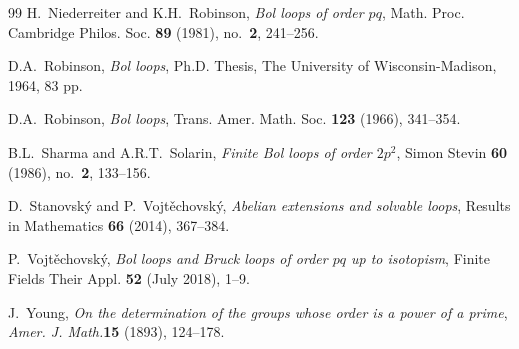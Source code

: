 \documentclass[12pt,reqno]{amsart}
\numberwithin{equation}{section}
\theoremstyle{plain}
\theoremstyle{definition}
\begin{document}
\begin{thebibliography}{99}
H.~Niederreiter and K.H.~Robinson, \emph{Bol loops of order $pq$}, Math. Proc. Cambridge Philos. Soc. \textbf{89} (1981), no.~\textbf{2}, 241--256.

D.A.~Robinson, \emph{Bol loops},  Ph.D. Thesis, The University of Wisconsin-Madison, 1964, 83 pp.

D.A.~Robinson, \emph{Bol loops}, Trans. Amer. Math. Soc. \textbf{123} (1966), 341--354.

B.L.~Sharma and A.R.T.~Solarin, \emph{Finite Bol loops of order $2p^2$}, Simon Stevin \textbf{60} (1986), no.~\textbf{2}, 133--156.

D.~Stanovsk\'y and P.~Vojt\v{e}chovsk\'y, \emph{Abelian extensions and solvable loops}, Results in Mathematics \textbf{66} (2014), 367--384.

P.~Vojt\v{e}chovsk\'y, \emph{Bol loops and Bruck loops of order $pq$ up to isotopism},  Finite Fields Their Appl. \textbf{52} (July 2018), 1--9.

J.~Young, \emph{On the determination of the groups whose order is a power of a prime}, \emph{Amer. J. Math.}\textbf{15} (1893), 124--178.

\end{thebibliography}
\end{document}
